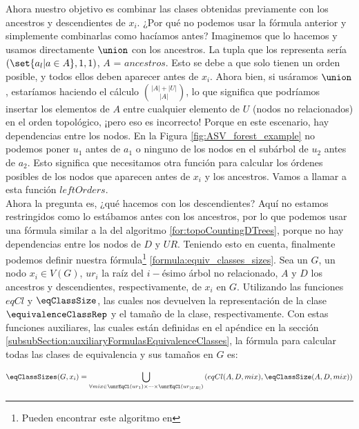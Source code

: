 Ahora nuestro objetivo es combinar las clases obtenidas previamente con los ancestros y descendientes de $x_i$. ¿Por qué no podemos usar la fórmula anterior y simplemente combinarlas como hacíamos antes? Imaginemos que lo hacemos y usamos directamente $\union$ con los ancestros. La tupla que los representa sería  $(\set{ a_l | a \in A}, 1, 1)$, $A$ = $ancestros$. Esto se debe a que solo tienen un orden posible, y todos ellos deben aparecer antes de $x_i$. Ahora bien, si usáramos $\union$, estaríamos haciendo el cálculo $\binom{|A| + |U|}{|A|}$, lo que significa que podríamos insertar los elementos de $A$ entre cualquier elemento de $U$ (nodos no relacionados) en el orden topológico, ¡pero eso es incorrecto! Porque en este escenario, hay dependencias entre los nodos. En la Figura \ref{fig:ASV_forest_example} no podemos poner $u_1$ antes de $a_1$ o ninguno de los nodos en el subárbol de $u_2$ antes de $a_2$. Esto significa que necesitamos otra función para calcular los órdenes posibles de los nodos que aparecen antes de $x_i$ y los ancestros. Vamos a llamar a esta función $leftOrders$. \\

Ahora la pregunta es, ¿qué hacemos con los descendientes? Aquí no estamos restringidos como lo estábamos antes con los ancestros, por lo que podemos usar una fórmula similar a la del algoritmo \ref{for:topoCountingDTrees}, porque no hay dependencias entre los nodos de $D$ y $UR$. Teniendo esto en cuenta, finalmente podemos definir nuestra fórmula\footnote{Pueden encontrar este algoritmo en } \ref{formula:equiv_classes_sizes}. Sea un \dtree{} $G$, un nodo $x_i \in V(G)$, $ur_i$ la raíz del $i-$ésimo árbol no relacionado, $A$ y $D$ los ancestros y descendientes, respectivamente, de $x_i$ en $G$. Utilizando las funciones $eqCl$ y $\eqClassSize$, las cuales nos devuelven la representación de la clase $\equivalenceClassRep$ y el tamaño de la clase, respectivamente. Con estas funciones auxiliares, las cuales están definidas en el apéndice en la sección \ref{subsubSection:auxiliaryFormulasEquivalenceClasses}, la fórmula para calcular todas las clases de equivalencia y sus tamaños en $G$ es:


\begin{align}\label{formula:equiv_classes_sizes}
    \eqClassSizes(G, x_i) = 
    \bigcup_{\forall mix \in \unrEqCl(ur_1) \times \dots \times \unrEqCl(ur_{|UR|})} \left( eqCl(A,D, mix) , \eqClassSize(A,D,mix) \right) 
\end{align}

